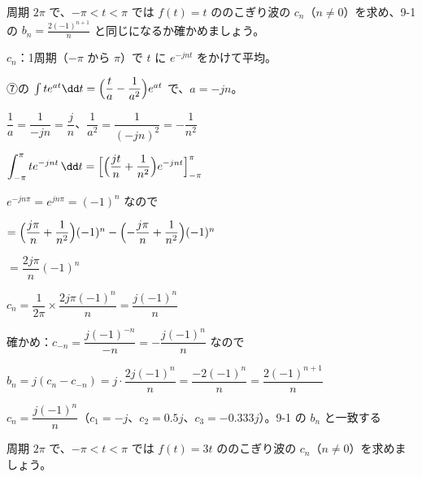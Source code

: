 \begin{reidai}
周期 $2\pi$ で、$-\pi<t<\pi$ では $f(t)=t$ ののこぎり波の $c_n$（$n\neq0$）を求め、9-1 の $b_n=\tfrac{2(-1)^{n+1}}{n}$ と同じになるか確かめましょう。\par
\kangaekata {}\par
{}\enspace $c_n$：1周期（$-\pi$ から $\pi$）で $t$ に $e^{-jnt}$ をかけて平均。\par
{}\enspace ⑦の $\int te^{at}\dd t=\Bigl(\dfrac{t}{a}-\dfrac{1}{a^2}\Bigr)e^{at}$ で、$a=-jn$。\par
\shiki\kixds{}\zw{} $\dfrac{1}{a}=\dfrac{1}{-jn}=\dfrac{j}{n}$、\quad $\dfrac{1}{a^2}=\dfrac{1}{(-jn)^2}=-\dfrac{1}{n^2}$\par
\kixda $\displaystyle\int_{-\pi}^{\pi}te^{-jnt}\,\dd t=\Bigl[\Bigl(\dfrac{jt}{n}+\dfrac{1}{n^2}\Bigr)e^{-jnt}\Bigr]_{-\pi}^{\pi}$\par
\kixda $e^{-jn\pi}=e^{jn\pi}=(-1)^n$ なので\par
\kixdb $=\Bigl(\dfrac{j\pi}{n}+\dfrac{1}{n^2}\Bigr)(-1)^n-\Bigl(-\dfrac{j\pi}{n}+\dfrac{1}{n^2}\Bigr)(-1)^n$\par
\kixdb $=\dfrac{2j\pi}{n}(-1)^n$\par
\kixda $c_n=\dfrac{1}{2\pi}\times\dfrac{2j\pi(-1)^n}{n}=\dfrac{j(-1)^n}{n}$\par
\kixda 確かめ：$c_{-n}=\dfrac{j(-1)^{-n}}{-n}=-\dfrac{j(-1)^n}{n}$ なので\par
\kixdb $b_n=j(c_n-c_{-n})=j\cdot\dfrac{2j(-1)^n}{n}=\dfrac{-2(-1)^n}{n}=\dfrac{2(-1)^{n+1}}{n}$\par
\kotae $c_n=\dfrac{j(-1)^n}{n}$（$c_1=-j$、$c_2=0.5j$、$c_3=-0.333j$）。9-1 の $b_n$ と一致する
\end{reidai}

\begin{jibun}
周期 $2\pi$ で、$-\pi<t<\pi$ では $f(t)=3t$ ののこぎり波の $c_n$（$n\neq0$）を求めましょう。
\end{jibun}


